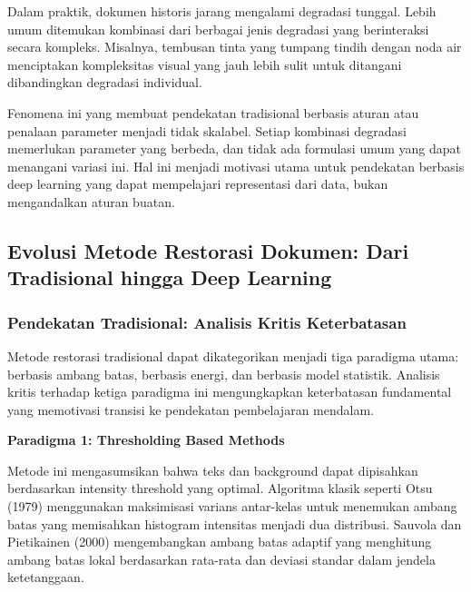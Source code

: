 \documentclass[12pt,a4paper]{article}
\begin{document}
\vspace{1.5ex}

Dalam praktik, dokumen historis jarang mengalami degradasi tunggal. Lebih umum ditemukan kombinasi dari berbagai jenis degradasi yang berinteraksi secara kompleks. Misalnya, tembusan tinta yang tumpang tindih dengan noda air menciptakan kompleksitas visual yang jauh lebih sulit untuk ditangani dibandingkan degradasi individual.

Fenomena ini yang membuat pendekatan tradisional berbasis aturan atau penalaan parameter menjadi tidak skalabel. Setiap kombinasi degradasi memerlukan parameter yang berbeda, dan tidak ada formulasi umum yang dapat menangani variasi ini. Hal ini menjadi motivasi utama untuk pendekatan berbasis deep learning yang dapat mempelajari representasi dari data, bukan mengandalkan aturan buatan.

\subsection{Evolusi Metode Restorasi Dokumen: Dari Tradisional hingga Deep Learning}
\label{subsec:evolusi-metode}

\vspace{1.5ex}

\subsubsection{Pendekatan Tradisional: Analisis Kritis Keterbatasan}
\label{subsubsec:metode-tradisional}

\vspace{1.5ex}

Metode restorasi tradisional dapat dikategorikan menjadi tiga paradigma utama: berbasis ambang batas, berbasis energi, dan berbasis model statistik. Analisis kritis terhadap ketiga paradigma ini mengungkapkan keterbatasan fundamental yang memotivasi transisi ke pendekatan pembelajaran mendalam.

\textbf{Paradigma 1: Thresholding Based Methods}

Metode ini mengasumsikan bahwa teks dan background dapat dipisahkan berdasarkan intensity threshold yang optimal. Algoritma klasik seperti Otsu (1979) menggunakan maksimisasi varians antar-kelas untuk menemukan ambang batas yang memisahkan histogram intensitas menjadi dua distribusi. Sauvola dan Pietikainen (2000) mengembangkan ambang batas adaptif yang menghitung ambang batas lokal berdasarkan rata-rata dan deviasi standar dalam jendela ketetanggaan.
\end{document}
